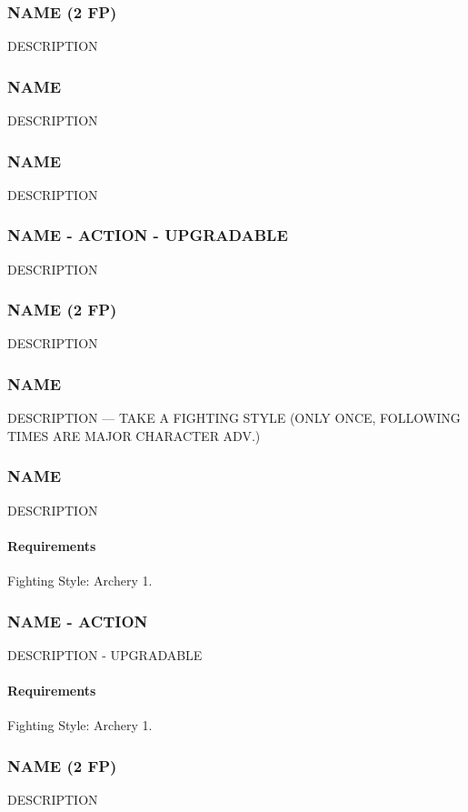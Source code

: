 \subsubsection{NAME (2 FP)} \label{feat::name}
    DESCRIPTION
\subsubsection{NAME} \label{feat::name}
    DESCRIPTION
\subsubsection{NAME} \label{feat::name}
    DESCRIPTION
\subsubsection{NAME - ACTION - UPGRADABLE} \label{feat::name}
    DESCRIPTION
\subsubsection{NAME (2 FP)} \label{feat::name}
    DESCRIPTION

\subsubsection{NAME} \label{feat::name}
    DESCRIPTION --- TAKE A FIGHTING STYLE (ONLY ONCE, FOLLOWING TIMES ARE MAJOR CHARACTER ADV.)
\subsubsection{NAME} \label{feat::name}
    DESCRIPTION
    \paragraph{Requirements} Fighting Style: Archery 1.
\subsubsection{NAME - ACTION} \label{feat::name}
    DESCRIPTION - UPGRADABLE
    \paragraph{Requirements} Fighting Style: Archery 1.
\subsubsection{NAME (2 FP)} \label{feat::name}
    DESCRIPTION
